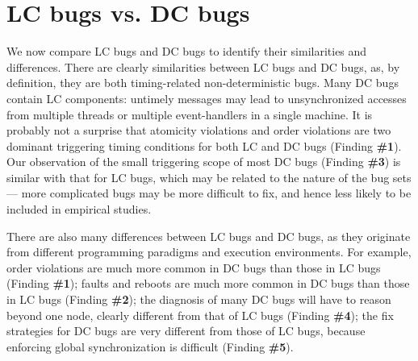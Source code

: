 

\section{LC bugs vs. DC bugs}

We now compare LC bugs and DC bugs to identify their similarities and differences.
There are clearly similarities between LC bugs and DC bugs, as, 
by definition, they are both timing-related non-deterministic bugs.
Many DC bugs contain LC components:
untimely messages may lead to unsynchronized accesses from 
multiple threads or multiple event-handlers 
\cite{vechev.oopsla13,satish.pldi14} in a single machine.
It is probably not a surprise that atomicity violations
and order violations are two dominant triggering timing conditions
for both LC and DC bugs (Finding {\bf \#1}). 
Our observation of the small triggering scope of most DC bugs
(Finding {\bf \#3})
is similar with that for LC bugs, which may be related to the nature
of the bug sets ---
more complicated bugs may be more difficult to fix, and
hence less likely to be included in empirical studies. 

There are also many differences between LC bugs and DC bugs, as they originate
from different programming paradigms and execution
environments. For example, order violations are much more common in DC bugs
than those in LC bugs (Finding {\bf \#1}); faults and reboots are much 
more common in DC bugs than those in LC bugs (Finding {\bf \#2}); 
the diagnosis of many DC bugs will have to reason beyond one node, 
clearly different from that of LC bugs (Finding {\bf \#4});
the fix
strategies for DC bugs are very different from those of LC bugs, because
enforcing global synchronization is difficult (Finding {\bf \#5}).
